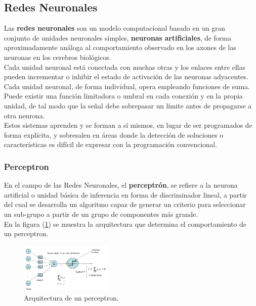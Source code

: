 \documentclass[osajnl,twocolumn,showpacs,superscriptaddress,10pt]{revtex4-1} %
\begin{document}
\subsection{Redes Neuronales}

Las \textbf{redes neuronales} son un modelo computacional basado en un gran conjunto de unidades neuronales simples, \textbf{neuronas artificiales}, de forma aproximadamente análoga al comportamiento observado en los axones de las neuronas en los cerebros biológicos. \\

Cada unidad neuronal está conectada con muchas otras y los enlaces entre ellas pueden incrementar o inhibir el estado de activación de las neuronas adyacentes. Cada unidad neuronal, de forma individual, opera empleando funciones de suma. Puede existir una función limitadora o umbral en cada conexión y en la propia unidad, de tal modo que la señal debe sobrepasar un límite antes de propagarse a otra neurona. \\

Estos sistemas aprenden y se forman a sí mismos, en lugar de ser programados de forma explícita, y sobresalen en áreas donde la detección de soluciones o características es difícil de expresar con la programación convencional.

\subsubsection{Perceptron}

En el campo de las Redes Neuronales, el \textbf{perceptrón}, se refiere a la neurona artificial o unidad básica de inferencia en forma de discriminador lineal, a partir del cual se desarrolla un algoritmo capaz de generar un criterio para seleccionar un sub-grupo a partir de un grupo de componentes más grande. \\

En la figura (\ref{figure:perceptron_example}) se muestra la arquitectura que determina el comportamiento de un perceptron.

\begin{figure}[H]
    \centering
    \includegraphics[width=0.4\textwidth]{theory/perceptron}
    \caption{Arquitectura de un perceptron.}
    \label{figure:perceptron_example}
\end{figure}
\end{document}
